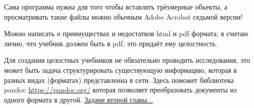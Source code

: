 Сама программа нужна для того чтобы вставлять трёхмерные объекты, а просматривать такие файлы можно обычным Adobe Acrobat седьмой версии!

Можно написать о преимуществах и недостатков html и pdf формата, я считаю лично, что учебник должен быть в pdf, это придаёт ему целостность.

Для создания целостных учебников не обязательно проводить исследования, это может быть задача структурировать существующую информацию, которая в разных видах (форматах) представленна в сети. Здесь поможет библиотека pandoc \url{https://pandoc.org/} которая позволяет преобразовать документы из одного формата в другой.
\hyperref[task2]{Задачи второй главы...}